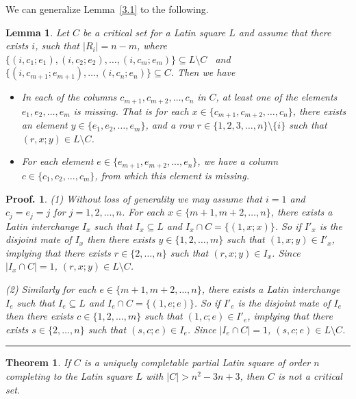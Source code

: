 \documentclass[12pt]{article}
\newtheorem{theorem}{Theorem}
\newtheorem{lemma}{Lemma}
\newtheorem{preproof}{{\bf Proof.}}
\newenvironment{proof}[1]{\begin{preproof}{\rm
               #1}\hfill{\rule[-0.5mm]{2mm}{2mm}}}{\end{preproof}}
\begin{document}
%
We can generalize Lemma~\ref{3.1} to the following.
%
\begin{lemma}
\label{3.2}
Let $C$ be a critical set for a Latin square $L$ and assume that
there exists $i$, such that
$|R_i| = n-m$, where
$\{(i, c_1; e_1), (i, c_2; e_2),\dots, (i, c_m; e_m) \}
\subseteq L\setminus C$ \  and
$\{(i,c_{m+1};e_{m+1}), \dots, (i, c_n; e_n) \}\subseteq  C$.
Then we have
\begin{itemize}
%
\item[$(1)$]
In each of the columns $c_{m+1},c_{m+2}, \dots, c_n$ in $C$, at least
one of the elements $e_1, e_2, \dots, e_m$ is missing.
That is for each $x \in \{c_{m+1}, c_{m+2}, \dots, c_n \}$,
there exists an element $y \in \{e_1, e_2, \dots, e_m \}$, and a row
$r \in \{1,2, 3, \dots, n \}\setminus \{i\}$
such that $(r, x; y)  \in L\setminus C$.
%
\item[$(2)$]
For each element $e \in \{e_{m+1},e_{m+2}, ..., e_n\}$, we have
a column $c \in \{c_1, c_2, \dots, c_m \}$, from which
this element is missing.
\end{itemize}
\end{lemma}
%
\begin{proof}{(1)
Without loss of generality we may assume that $i=1$ and $c_j = e_j = j$ for
$j = 1,2, \dots, n$.
For each $x \in \{m+1, m+2, \dots, n \}$,
there exists a Latin interchange $I_x$ such that
$I_x\subseteq L$ and $I_x \cap C = \{ (1, x;x) \}$.
So if $I'_x$ is the disjoint mate of $I_x$ then there exists
$y \in \{1, 2, \dots, m \}$ such that $(1,x;y) \in I'_x$, implying that
there exists $r \in \{ 2, \dots, n \}$ such that $(r,x;y) \in I_x$.
Since $|I_x \cap C| = 1$, $(r,x;y) \in L\setminus C$.

\noindent
(2) Similarly
for each $e \in \{m+1, m+2, \dots, n \}$,
there exists a Latin interchange $I_e$ such that
$I_e\subseteq L$ and $I_e \cap C = \{ (1, e;e) \}$.
So if $I'_e$ is the disjoint mate of $I_e$ then there exists
$c \in \{1, 2, \dots, m \}$ such that $(1,c;e) \in I'_e$, implying that
there exists $s \in \{ 2, \dots, n \}$ such that $(s,c;e) \in I_e$.
Since $|I_e \cap C| = 1$, $(s,c;e) \in L\setminus C$.
}\end{proof}
%
\begin{theorem}
\label{th3.1}
If $C$ is a uniquely completable partial Latin square of order $n$
completing to the Latin square $L$
with $| C | > n^2-3n+3$, then $C$ is not a critical set.
\end{theorem}
\end{document}
